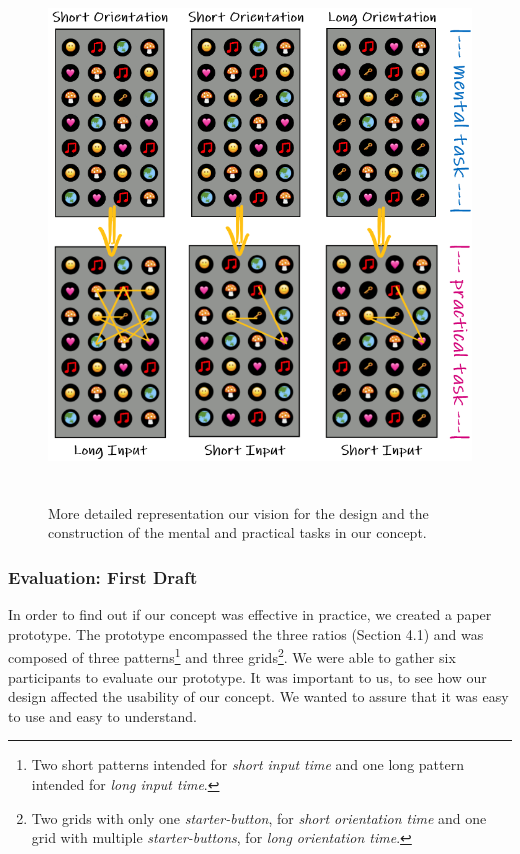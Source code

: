 \begin{figure}[t!]
\centering
\includegraphics[width=14cm, height=14cm]{Chapters/graphics/firstdraft.PNG}
\caption{More detailed representation our vision for the design and the construction of the mental and practical tasks in our concept.    }
\label{fig:firstdraft}
\end{figure}

\subsubsection{Evaluation: First Draft} \label{4.2.2.2}
In order to find out if our concept was effective in practice, we created a paper prototype. The prototype encompassed the three ratios (Section 4.1) and was composed of three patterns\footnote{Two short patterns intended for \textit{short input time} and one long pattern intended for \textit{long input time}.} and three grids\footnote{Two grids with only one \textit{starter-button}, for \textit{short orientation time} and one grid with multiple \textit{starter-buttons}, for \textit{long orientation time}.}. We were able to gather six participants to evaluate our prototype. It was important to us, to see how our design affected the usability of our concept. We wanted to assure that it was easy to use and easy to understand. 


